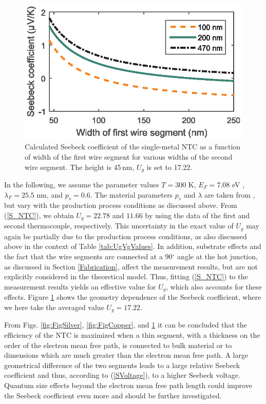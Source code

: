 \documentclass[journal]{IEEEtran}
\newcommand{\mathrmm}[1]{{#1}}
\begin{document}
\begin{figure}[h]
\centering
\includegraphics[width=1\columnwidth,clip]{figures/SMNTCSeebeckN.eps}
\caption{Calculated Seebeck coefficient of the single-metal NTC as a function of width of the first wire segment for various widths of the second wire segment. The height is 45\,nm, $U_\mathrmm{g}$ is set to 17.22.}
\label{fig:SMNTCSeebeck}
\end{figure}
In the following, we assume the parameter values $T = 300$ K, $E_\mathrmm{F} = 7.08$ eV \cite{mueller1970electronic}, $\lambda_F = 25.5$ nm, and $\mathrmm{p_s} = 0.6$. The material parameters $p_s$ and $\lambda$ are taken from \cite{shivaprasad1980electrical}, but vary with the production process conditions as discussed above. From (\ref{S_NTC}), we obtain $ U_\mathrmm{g} = 22.78$ and $11.66$ by using the data of the first and second thermocouple, respectively. This uncertainty in the exact value of $U_\mathrmm{g}$ may again be partially due to the production process conditions, as also discussed above in the context of Table \ref{tab:UgVgValues}. In addition, substrate effects and the fact that the wire segments are connected at a 90$^{\circ}$ angle at the hot junction, as discussed in Section \ref{Fabrication}, affect the measurement results, but are not explicitly considered in the theoretical model. Thus, fitting (\ref{S_NTC}) to the measurement results yields an effective value for $U_\mathrmm{g}$, which also accounts for these effects. Figure \ref{fig:SMNTCSeebeck} shows the geometry dependence of the Seebeck coefficient, where we here take the averaged value $ U_\mathrmm{g} = 17.22$.

From Figs. \ref{fig:FigSilver}, \ref{fig:FigCopper},  and \ref{fig:SMNTCSeebeck} it can be concluded that the efficiency of the NTC is maximized when a thin segment, with a thickness on the order of the electron mean free path, is connected to bulk material or to dimensions which are much greater than the electron mean free path. A large geometrical difference of the two segments leads to a large relative Seebeck coefficient and thus, according to (\ref{SVoltage}), to a higher Seebeck voltage. Quantum size effects beyond the electron mean free path length could improve the Seebeck coefficient even more and should be further investigated. 
%
%
%
\end{document}
